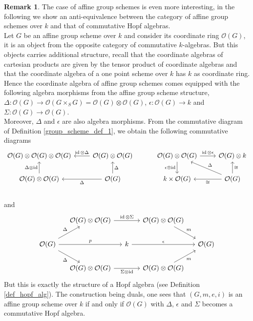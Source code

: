 \documentclass{article}
\theoremstyle{plain}
\theoremstyle{definition}
\newtheorem{remark}{Remark}
\DeclareMathOperator{\id}{id}
\begin{document}
\begin{remark}
\label{Hopf_algebra_group_scheme}
The case of affine group schemes is even more interesting, in the following we show an anti-equivalence between the category of affine group schemes over $k$ and that of commutative Hopf algebras.\\
Let $G$ be an affine group scheme over $k$ and consider its coordinate ring $\mathcal{O}(G)$, it is an object from the opposite category of commutative $k$-algebras. 
But this objects carries additional structure, recall that the coordinate algebras of cartesian products are given by the tensor product of coordinate algebras and that the coordinate algebra of a one point scheme over $k$ has $k$ as coordinate ring.\\
Hence the coordinate algebra of affine group schemes comes equipped with the following algebra morphisms from the affine group scheme structure, $\Delta: \mathcal{O}(G)\rightarrow \mathcal{O}(G\times_S G) = \mathcal{O}(G)\otimes \mathcal{O}(G)$, $\epsilon : \mathcal{O}(G)\rightarrow k$ and $\Sigma: \mathcal{O}(G)\rightarrow \mathcal{O}(G)$.\\
Moreover, $\Delta$ and $\epsilon$ are also algebra morphisms.
From the commutative diagram of Definition \ref{group_scheme_def_1}, we obtain the following commutative diagrams
\[
    \begin{tikzcd}
        \mathcal{O}(G)\otimes \mathcal{O}(G) \otimes \mathcal{O}(G)   & \mathcal{O}(G)\otimes \mathcal{O}(G) \arrow[l,"\id\otimes \Delta"'] \\
        \mathcal{O}(G)\otimes \mathcal{O}(G) \arrow[u, "\Delta\otimes \id"]  &  \mathcal{O}(G) \arrow[u,"\Delta"'] \arrow[l,"\Delta"]
    \end{tikzcd}
    \hspace{1cm}
    \begin{tikzcd}
        \mathcal{O}(G)\otimes \mathcal{O}(G) \arrow[r,"\id\otimes\epsilon"] \arrow[d,"\epsilon\otimes\id"']& \mathcal{O}(G)\otimes k \\
        k\times \mathcal{O}(G) &  \mathcal{O}(G)\arrow[u,"\cong"'] \arrow[l,"\cong"] \arrow[ul, "\Delta"']
    \end{tikzcd}
    \]
    \\
    and
    \[
    \begin{tikzcd}[column sep=small]
        & \mathcal{O}(G)\otimes \mathcal{O}(G) \arrow[rr, "\id\otimes \Sigma"] && \mathcal{O}(G)\otimes \mathcal{O}(G) \arrow[dr,"m"] \\
        \mathcal{O}(G)\arrow[rr, "p"] \arrow[ur,"\Delta"] \arrow[dr,"\Delta"'] && k \arrow[rr,"\epsilon"] && \mathcal{O}(G)\\
        & \mathcal{O}(G)\otimes \mathcal{O}(G) \arrow[rr,"\Sigma\otimes\id"'] &&  \mathcal{O}(G)\otimes \mathcal{O}(G) \arrow[ur,"m"']
    \end{tikzcd}
    \]
    But this is exactly the structure of a Hopf algebra (see Definition \ref{def_hopf_alg}). 
    The construction being duals, one sees that $(G, m, e,i)$ is an affine group scheme over $k$ if and only if $\mathcal{O}(G)$ with $\Delta$, $\epsilon$ and $\Sigma$ becomes a commutative Hopf algebra.
    
\end{remark}
\end{document}
